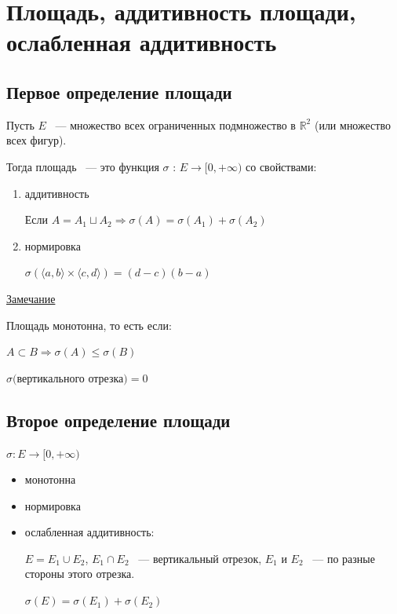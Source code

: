\documentclass{article}
\begin{document}
	\newpage
		
	\section{Площадь, аддитивность площади, ослабленная аддитивность}
		
		\subsection{Первое определение площади}
			
			Пусть $E$ ~--- множество всех ограниченных подмножество в $\mathbb{R}^2$ (или множество всех фигур).
			
			Тогда площадь ~--- это функция $\sigma$ : $E \rightarrow [0, +\infty)$ со свойствами:
			
			\begin{enumerate}
			
				\item аддитивность
				
					Если $A = A_1 \sqcup A_2 \Rightarrow \sigma(A) = \sigma(A_1) + \sigma(A_2)$
				
				\item нормировка
				
					$\sigma(\langle a, b \rangle \times \langle c, d \rangle) = (d - c)(b - a)$ 
		
			\end{enumerate}
			
			\underline{Замечание}
			
				Площадь монотонна, то есть если:	
			
				$A \subset B \Rightarrow \sigma(A) \leq \sigma(B)$
			
				$\sigma($вертикального отрезка$) = 0$
				
		\subsection{Второе определение площади}
			
			$\sigma : E \rightarrow [0, +\infty)$
				
			\begin{itemize}
				
				\item монотонна
					
				\item нормировка
					
				\item ослабленная аддитивность:
					
					$E = E_1 \cup E_2$, $E_1 \cap E_2$ ~--- вертикальный отрезок, $E_1$ и $E_2$ ~--- по разные стороны этого отрезка.
					
					$\sigma(E) = \sigma(E_1) + \sigma(E_2)$
						
			\end{itemize}
	
\end{document}
